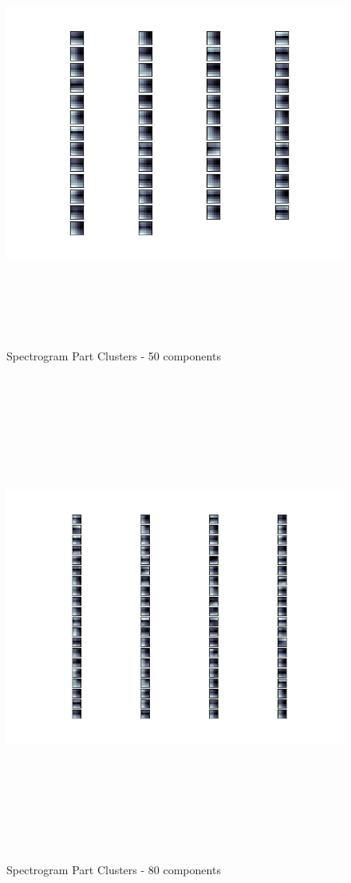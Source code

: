\documentclass[11pt]{article}
\begin{document}
\begin{figure}[htb]
\centering
\includegraphics[height=14cm]{./spec_avg_parts_50.png}
\caption{\label{fig:spec_avg_parts_50}Spectrogram Part Clusters - 50 components}
\end{figure}

\begin{figure}[htb]
\centering
\includegraphics[height=16cm]{./spec_avg_parts_80.png}
\caption{\label{fig:spec_avg_parts_80}Spectrogram Part Clusters - 80 components}
\end{figure}
\end{document}
